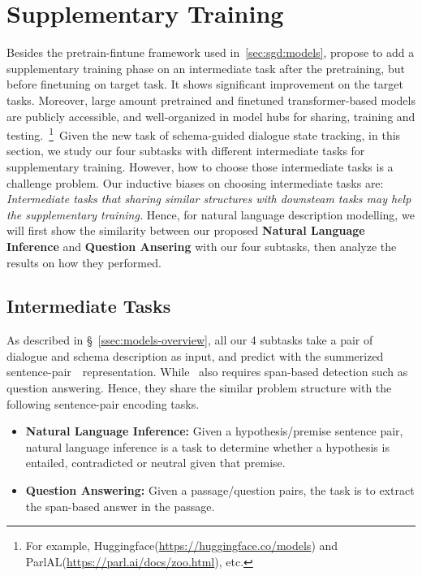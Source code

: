 \section{Supplementary Training}
\label{sec:sgd:sup-training}
Besides the pretrain-fintune framework used in~\autoref{sec:sgd:models},
\citet{phang2018sentence} propose to add a supplementary training
phase on an intermediate task after the pretraining, but before
finetuning on target task. It shows significant improvement on the
target tasks. Moreover, large amount pretrained and finetuned
transformer-based models are publicly accessible, and well-organized
in model hubs for sharing, training and testing.~\footnote{For example,
  Huggingface(\url{https://huggingface.co/models}) and
  ParlAL(\url{https://parl.ai/docs/zoo.html}), etc.}~Given the new
task of schema-guided dialogue state tracking, in this section, we study
our four subtasks with different intermediate tasks for supplementary
training. However, how to choose those intermediate tasks is a
challenge problem. Our inductive biases on choosing intermediate tasks
are: \textit{Intermediate tasks that sharing similar structures with
  downsteam tasks may help the supplementary training.}  Hence, for
natural language description modelling, we will first show the
similarity between our proposed \textbf{Natural Language Inference}
and \textbf{Question Ansering} with our four subtasks, then analyze
the results on how they performed.

\subsection{Intermediate Tasks}
\label{ssec:intermediate-tasks}
As described in \S~\ref{ssec:models-overview}, all our 4
subtasks take a pair of dialogue and schema description as input, and
predict with the summerized sentence-pair~\CLS~representation. While
\NSL~also requires span-based detection such as question
answering. Hence, they share the similar problem structure with the
following sentence-pair encoding tasks.
\begin{itemize}
\item \textbf{Natural Language Inference:} Given a hypothesis/premise
sentence pair, natural language inference is a task to determine
whether a hypothesis is entailed, contradicted or neutral given
that premise.

\item \textbf{Question Answering:} Given a passage/question pairs, the
task is to extract the span-based answer in the passage.
\end{itemize}

